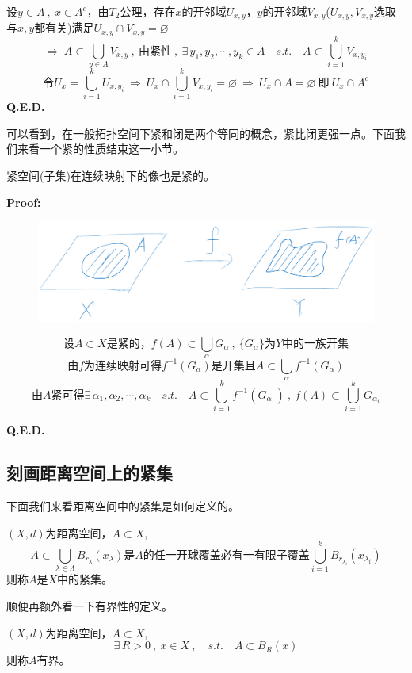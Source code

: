 设$y \in A \ , \ x \in A^c$，由$T_2$公理，存在$x$的开邻域$U_{x,y}$，$y$的开邻域$V_{x,y}$($U_{x,y},V_{x,y}$选取与$x,y$都有关)满足$U_{x,y} \cap V_{x,y}=\varnothing$
\[\Rightarrow \ A \subset \bigcup_{y \in A}V_{x,y} \ , \ \text{由紧性} \ , \ \exists \, y_1,y_2,\cdots,y_k \in A \quad s.t. \quad A \subset \bigcup_{i=1}^kV_{x,y_i}\]
\[\text{令}U_x=\bigcup_{i=1}^kU_{x,y_i} \ \Rightarrow \ U_x \cap \bigcup_{i=1}^kV_{x,y_i}=\varnothing \ \Rightarrow \ U_x \cap A=\varnothing \ \text{即} \ U_x \cap A^c\]
\textbf{Q.E.D.}

可以看到，在一般拓扑空间下紧和闭是两个等同的概念，紧比闭更强一点。下面我们来看一个紧的性质结束这一小节。
\begin{theorem}
    紧空间(子集)在连续映射下的像也是紧的。
\end{theorem}
\textbf{Proof:}
\begin{figure}[htbp]
    \center
    \includegraphics[scale=0.2]{./fig/2.2.2-1.png}
\end{figure}
\[\text{设}A \subset X\text{是紧的，}f(A) \subset \bigcup_\alpha G_\alpha \ , \ \{G_{\alpha}\}\text{为}Y\text{中的一族开集}\]
\[\text{由$f$为连续映射可得}f^{-1}(G_{\alpha})\text{是开集且}A \subset \bigcup_{\alpha}f^{-1}(G_{\alpha})\]
\[\text{由$A$紧可得} \exists \, \alpha_1,\alpha_2,\cdots,\alpha_k \quad s.t. \quad A \subset \bigcup_{i=1}^kf^{-1}(G_{\alpha_1}) \ , \ f(A) \subset \bigcup_{i=1}^kG_{\alpha_i}\]

\textbf{Q.E.D.}

\subsection{刻画距离空间上的紧集} \label{compact}
下面我们来看距离空间中的紧集是如何定义的。
\begin{definition}[距离空间中的紧集]
    $(X,d)$为距离空间，$A \subset X$,
    \[A \subset \bigcup_{\lambda \in \Lambda}B_{r_{\lambda}}(x_{\lambda})\text{是$A$的任一开球覆盖必有一有限子覆盖}\bigcup_{i=1}^kB_{r_{\lambda_i}}(x_{\lambda_i})\]
    则称$A$是$X$中的紧集。
\end{definition}
顺便再额外看一下有界性的定义。
\begin{definition}[距离空间中的有界性]
    $(X,d)$为距离空间，$A \subset X$,
    \[\exists \, R>0 \ , \ x \in X \ , \quad s.t. \quad A \subset B_R(x)\]
    则称$A$有界。
\end{definition}
